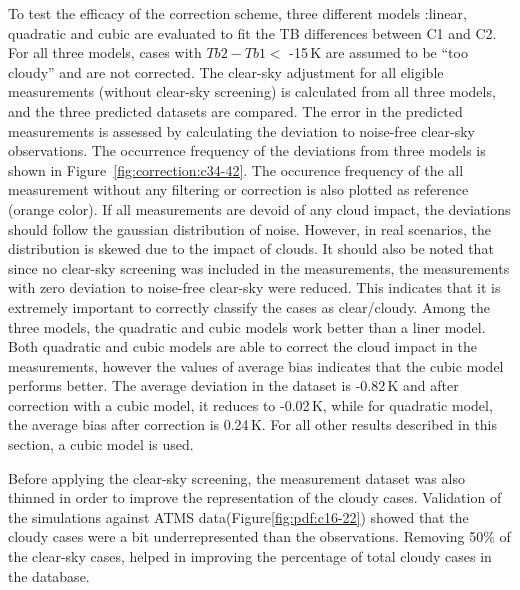 \documentclass[12pt]{article}
\begin{document}
To test the efficacy of the correction scheme, three different models :linear, quadratic and cubic are evaluated to fit the TB differences between C1 and C2. For all three models, cases with $Tb2-Tb1 < $ -15\,K are assumed to be ``too cloudy'' and are not corrected.  The clear-sky adjustment for all eligible measurements (without clear-sky screening) is calculated from all three models, and the three predicted datasets are compared. The error in the predicted measurements is assessed by calculating the deviation to noise-free clear-sky observations. The occurrence frequency of the deviations from three models is shown in Figure~\ref{fig:correction:c34-42}. The occurence frequency of the all measurement without any filtering or correction is also plotted as reference (orange color). If all measurements are devoid of any cloud impact, the deviations should follow the gaussian distribution of noise. However, in real scenarios, the distribution is skewed due to the impact of clouds. It should also be noted that since no clear-sky screening was included in the measurements, the measurements with zero deviation to noise-free clear-sky were reduced. This indicates that it is extremely important to correctly classify the cases as clear/cloudy. Among the three models, the quadratic and cubic models work better than a liner model. Both quadratic and cubic models are able to correct the cloud impact in the measurements, however the values of average bias indicates that the cubic model performs better. The average deviation in the dataset is -0.82\,K and after correction with a cubic model, it reduces to -0.02\,K, while for quadratic model, the average bias after correction is 0.24\,K. For all other results described in this section, a cubic model is used.


Before applying the clear-sky screening, the measurement dataset was also thinned in order to improve the representation of the cloudy cases. Validation of the simulations against ATMS data(Figure\ref{fig:pdf:c16-22}) showed that the cloudy cases were a bit underrepresented than the observations. Removing 50\% of the clear-sky cases, helped in improving the percentage of total cloudy cases in the database. 
\end{document}

